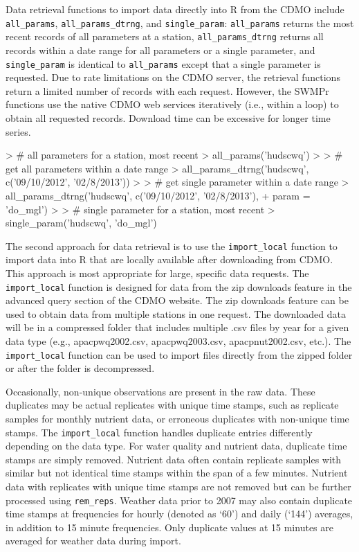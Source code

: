Data retrieval functions to import data directly into R from the CDMO include \texttt{all\_params}, \texttt{all\_params\_dtrng}, and \texttt{single\_param}: \texttt{all\_params} returns the most recent records of all parameters at a station, \texttt{all\_params\_dtrng} returns all records within a date range for all parameters or a single parameter, and \texttt{single\_param} is identical to \texttt{all\_params} except that a single parameter is requested. Due to rate limitations on the CDMO server, the retrieval functions return a limited number of records with each request.  However, the SWMPr functions use the native CDMO web services iteratively (i.e., within a loop) to obtain all requested records.  Download time can be excessive for longer time series.     

\begin{example}
> # all parameters for a station, most recent
> all_params('hudscwq')
> 
> # get all parameters within a date range
> all_params_dtrng('hudscwq', c('09/10/2012', '02/8/2013'))
> 
> # get single parameter within a date range
> all_params_dtrng('hudscwq', c('09/10/2012', '02/8/2013'), 
+   param = 'do_mgl')
> 
> # single parameter for a station, most recent
> single_param('hudscwq', 'do_mgl')
\end{example}

The second approach for data retrieval is to use the \texttt{import\_local} function to import data into R that are locally available after downloading from CDMO.  This approach is most appropriate for large, specific data requests. The \texttt{import\_local} function is designed for data from the zip downloads feature in the advanced query section of the CDMO website. The zip downloads feature can be used to obtain data from multiple stations in one request.  The downloaded data will be in a compressed folder that includes multiple .csv files by year for a given data type (e.g., apacpwq2002.csv, apacpwq2003.csv, apacpnut2002.csv, etc.).  The \texttt{import\_local} function can be used to import files directly from the zipped folder or after the folder is decompressed.

Occasionally, non-unique observations are present in the raw data.  These duplicates may be actual replicates with unique time stamps, such as replicate samples for monthly nutrient data, or erroneous duplicates with non-unique time stamps.  The \texttt{import\_local} function handles duplicate entries differently depending on the data type.  For water quality and nutrient data, duplicate time stamps are simply removed.  Nutrient data often contain replicate samples with similar but not identical time stamps within the span of a few minutes.  Nutrient data with replicates with unique time stamps are not removed but can be further processed using \texttt{rem\_reps}.  Weather data prior to 2007 may also contain duplicate time stamps at frequencies for hourly (denoted as `60') and daily (`144') averages, in addition to 15 minute frequencies.  Only duplicate values at 15 minutes are averaged for weather data during import.  

